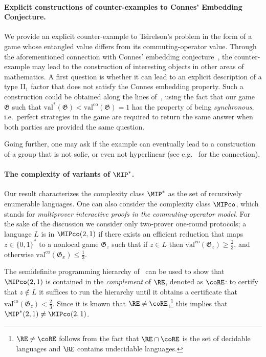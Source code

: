 \documentclass[11pt]{article}
\theoremstyle{definition}
\newcommand{\val}{\ensuremath{\mathrm{val}}}
\newcommand{\valco}{\ensuremath{\mathrm{val}^{\mathrm{co}}}}
\newcommand{\game}{\mathfrak{G}}
\begin{document}
\paragraph{Explicit constructions of counter-examples to Connes' Embedding Conjecture.} We provide an explicit counter-example to Tsirelson's problem in the form of a game whose entangled value differs from its commuting-operator value. Through the aforementioned connection with Connes' embedding conjecture~\cite{fritz2012tsirelson,junge2011connes,ozawa2013connes}, the counter-example may lead to the construction of interesting objects in other areas of mathematics. A first question is whether it can lead to an explicit description of a type II$_1$ factor that does not satisfy the Connes embedding property. Such a construction could be obtained along the lines of~\cite{kim2018synchronous}, using the fact that our game $\game$ such that $\val^*(\game) < \valco(\game) = 1$ has the property of being \emph{synchronous}, i.e.\ perfect strategies in the game are required to return the same answer when both parties are provided the same question. 

Going further, one may ask if the example can eventually lead to a construction of a group that is not sofic, or even not hyperlinear (see e.g.~\cite{capraro2015introduction} for the connection). 

\paragraph{The complexity of variants of $\MIP^*$.} Our result characterizes the complexity class $\MIP^*$ as the set of recursively enumerable languages. One can also consider the complexity class $\MIPco$, which stands for \emph{multiprover interactive proofs in the commuting-operator model}. For the sake of the discussion we consider only two-prover one-round protocols; a language $L$ is in $\MIPco(2,1)$ if there exists an efficient reduction that maps $z \in \{0,1\}^*$ to a nonlocal game $\game_z$ such that if $z \in L$ then $\valco(\game_z) \geq \frac{2}{3}$, and otherwise $\valco(\game_x) \leq \frac{1}{3}$.

The semidefinite programming hierarchy of~\cite{navascues2008convergent,doherty2008quantum} can be used to show that $\MIPco(2,1)$ is contained in the \emph{complement} of $\RE$, denoted as $\coRE$: to certify that $z \notin L$ it suffices to run the hierarchy until it obtains a certificate that $\valco(\game_z) < \frac{2}{3}$. Since it is known that $\RE \neq \coRE$,\footnote{$\RE \neq \coRE$ follows from the fact that $\RE \cap \coRE$ is the set of decidable languages and $\RE$ contains undecidable languages.} this implies that $\MIP^*(2,1) \neq \MIPco(2,1)$.
\end{document}
